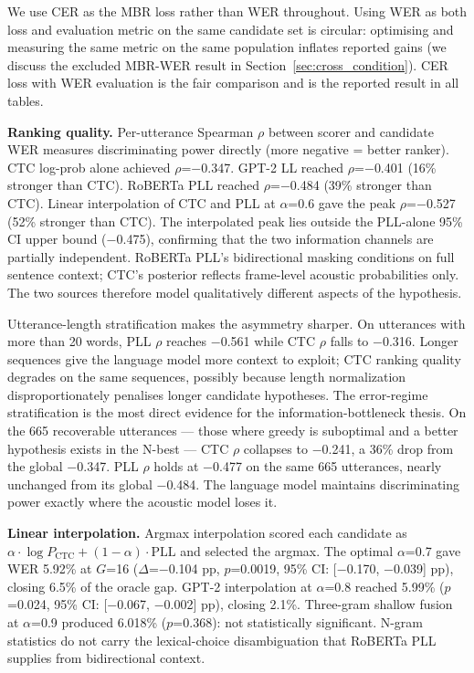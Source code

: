 We use CER as the MBR loss rather than WER throughout. Using WER as both loss and evaluation metric on the same
candidate set is circular: optimising and measuring the same metric on the same population inflates
reported gains (we discuss the excluded MBR-WER result in Section~\ref{sec:cross_condition}). CER loss with WER evaluation is the fair comparison and is the
reported result in all tables.

\textbf{Ranking quality.} Per-utterance Spearman $\rho$ between scorer and candidate WER measures
discriminating power directly (more negative = better ranker). CTC
log-prob alone achieved $\rho$=$-$0.347. GPT-2 LL reached $\rho$=$-$0.401 (16\% stronger than CTC).
RoBERTa PLL reached $\rho$=$-$0.484 (39\% stronger than CTC). Linear interpolation of CTC and PLL at
$\alpha$=0.6 gave the peak $\rho$=$-$0.527 (52\% stronger than CTC). The interpolated peak lies outside
the PLL-alone 95\% CI upper bound ($-$0.475), confirming that the two information channels are
partially independent. RoBERTa PLL's bidirectional masking conditions on full sentence context; CTC's
posterior reflects frame-level acoustic probabilities only. The two sources therefore model
qualitatively different aspects of the hypothesis.

Utterance-length stratification makes the asymmetry sharper. On utterances with more than 20 words,
PLL $\rho$ reaches $-$0.561 while CTC $\rho$ falls to $-$0.316. Longer sequences give the language model
more context to exploit; CTC ranking quality degrades on the same sequences, possibly because length normalization disproportionately penalises longer candidate hypotheses. The
error-regime stratification is the most direct evidence for the information-bottleneck thesis. On the
665 recoverable utterances — those where greedy is suboptimal and a better hypothesis exists in the
N-best — CTC $\rho$ collapses to $-$0.241, a 36\% drop from the global $-$0.347. PLL $\rho$ holds at
$-$0.477 on the same 665 utterances, nearly unchanged from its global $-$0.484. The language model
maintains discriminating power exactly where the acoustic model loses it.

\textbf{Linear interpolation.} Argmax interpolation scored each candidate as
$\alpha \cdot \log P_{\text{CTC}} + (1-\alpha) \cdot \text{PLL}$ and selected the argmax. The
optimal $\alpha$=0.7 gave WER 5.92\% at $G$=16 ($\Delta$=$-$0.104 pp, $p$=0.0019, 95\% CI:
[$-$0.170, $-$0.039] pp), closing 6.5\% of the oracle gap. GPT-2 interpolation at $\alpha$=0.8 reached
5.99\% ($p$=0.024, 95\% CI: [$-$0.067, $-$0.002] pp), closing 2.1\%.
Three-gram shallow fusion at $\alpha$=0.9 produced 6.018\% ($p$=0.368): not statistically
significant. N-gram statistics do not carry the lexical-choice disambiguation
that RoBERTa PLL supplies from bidirectional context.

